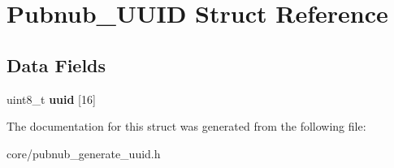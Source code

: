 \hypertarget{structPubnub__UUID}{\section{Pubnub\-\_\-\-U\-U\-I\-D Struct Reference}
\label{structPubnub__UUID}
}
\subsection*{Data Fields}
\begin{DoxyCompactItemize}
\item 
\hypertarget{structPubnub__UUID_a31168d13b2fc47a5bdcd36b682fc62ca}{uint8\-\_\-t {\bfseries uuid} \mbox{[}16\mbox{]}}\label{structPubnub__UUID_a31168d13b2fc47a5bdcd36b682fc62ca}

\end{DoxyCompactItemize}


The documentation for this struct was generated from the following file\-:\begin{DoxyCompactItemize}
\item 
core/pubnub\-\_\-generate\-\_\-uuid.\-h\end{DoxyCompactItemize}
